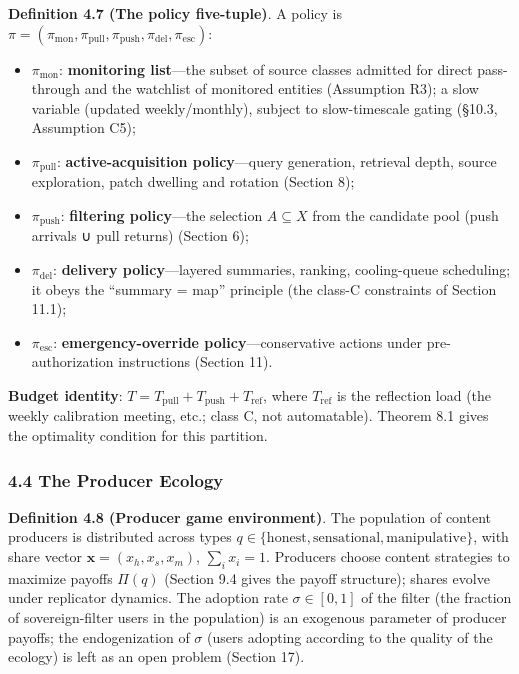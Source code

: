 \documentclass[
  11pt]{article}
\providecommand{\tightlist}{%
  \setlength{\itemsep}{0pt}\setlength{\parskip}{0pt}}
\begin{document}
\textbf{Definition 4.7 (The policy five-tuple)}. A policy is
\(\pi = (\pi_{\mathrm{mon}}, \pi_{\mathrm{pull}}, \pi_{\mathrm{push}}, \pi_{\mathrm{del}}, \pi_{\mathrm{esc}})\):

\begin{itemize}
\tightlist
\item
  \(\pi_{\mathrm{mon}}\): \textbf{monitoring list}---the subset of
  source classes admitted for direct pass-through and the watchlist of
  monitored entities (Assumption R3); a slow variable (updated
  weekly/monthly), subject to slow-timescale gating (§10.3, Assumption
  C5);
\item
  \(\pi_{\mathrm{pull}}\): \textbf{active-acquisition policy}---query
  generation, retrieval depth, source exploration, patch dwelling and
  rotation (Section 8);
\item
  \(\pi_{\mathrm{push}}\): \textbf{filtering policy}---the selection
  \(A \subseteq X\) from the candidate pool (push arrivals ∪ pull
  returns) (Section 6);
\item
  \(\pi_{\mathrm{del}}\): \textbf{delivery policy}---layered summaries,
  ranking, cooling-queue scheduling; it obeys the ``summary = map''
  principle (the class-C constraints of Section 11.1);
\item
  \(\pi_{\mathrm{esc}}\): \textbf{emergency-override
  policy}---conservative actions under pre-authorization instructions
  (Section 11).
\end{itemize}

\textbf{Budget identity}:
\(T = T_{\mathrm{pull}} + T_{\mathrm{push}} + T_{\mathrm{ref}}\), where
\(T_{\mathrm{ref}}\) is the reflection load (the weekly calibration
meeting, etc.; class C, not automatable). Theorem 8.1 gives the
optimality condition for this partition.

\subsubsection{4.4 The Producer Ecology}\label{the-producer-ecology}

\textbf{Definition 4.8 (Producer game environment)}. The population of
content producers is distributed across types
\(q \in \{\mathrm{honest}, \mathrm{sensational}, \mathrm{manipulative}\}\),
with share vector \(\mathbf{x} = (x_h, x_s, x_m)\), \(\sum_i x_i = 1\).
Producers choose content strategies to maximize payoffs \(\Pi(q)\)
(Section 9.4 gives the payoff structure); shares evolve under replicator
dynamics. The adoption rate \(\sigma \in [0,1]\) of the filter (the
fraction of sovereign-filter users in the population) is an exogenous
parameter of producer payoffs; the endogenization of \(\sigma\) (users
adopting according to the quality of the ecology) is left as an open
problem (Section 17).
\end{document}
